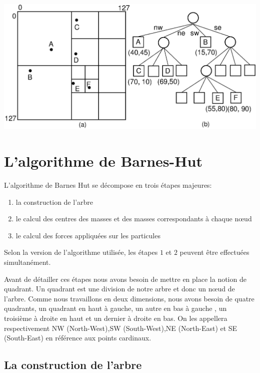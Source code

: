 \begin{center}
\includegraphics[scale=0.2]{./images/quadtree.png}
\captionsetup{hypcap=false}
\label{fig6}
\end{center}

\section{L'algorithme de Barnes-Hut}
L'algorithme de Barnes Hut se décompose en trois étapes majeures:

\begin{enumerate}
\item la construction de l'arbre

\item le calcul des centres des masses et des masses correspondants à chaque nœud

\item le calcul des forces appliquées sur les particules
\end{enumerate}

Selon la version de l'algorithme utilisée, les étapes $1$ et $2$ peuvent être effectuées simultanément. 

Avant de détailler ces étapes nous avons besoin de mettre en place la notion de quadrant. Un quadrant est une division de notre arbre et donc un nœud de l'arbre. Comme nous travaillons en deux dimensions, nous avons besoin de quatre quadrants, un quadrant en haut à gauche, un autre en bas à gauche , un troisième à droite en haut et un dernier à droite en bas. On les appellera respectivement NW (North-West),SW (South-West),NE (North-East) et SE (South-East) en référence aux points cardinaux.

\subsection{La construction de l'arbre}

